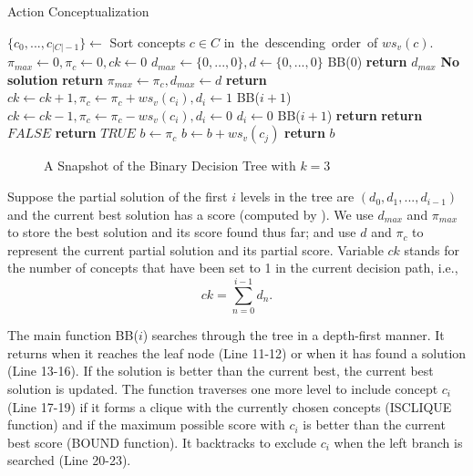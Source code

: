 \begin{algorithm}[th]
\caption{Action Conceptualization}
\label{al:backtrack}
\begin{algorithmic}[1]
\State $\{c_0,...,c_{|C|-1}\}\leftarrow$ Sort concepts $c\in C$ in\ the\ descending\ order\ of $ws_v(c)$.
\State $\pi_{max} \leftarrow 0,\pi_{c} \leftarrow 0,ck \leftarrow 0$
\State $d_{max}\leftarrow\{0,...,0\},d\leftarrow\{0,...,0\}$
\State BB($0$)
\State \textbf{return} $d_{max}$
\Else
\State \textbf{No solution}
\EndIf
\EndFunction
\Statex
{}
\State \textbf{return}
\EndIf
{}
\State $\pi_{max} \leftarrow \pi_{c}, d_{max} \leftarrow d$
\EndIf
\State \textbf{return}
\EndIf
{}
\State $ck \leftarrow ck+1, \pi_{c} \leftarrow \pi_{c}+ws_v(c_i), d_i \leftarrow 1$
\State BB($i+1$)
\State $ck \leftarrow ck-1, \pi_{c} \leftarrow \pi_{c}-ws_v(c_i), d_i \leftarrow 0$
\EndIf
{}
\State $d_i \leftarrow 0$
\State BB($i+1$)
\EndIf
\State \textbf{return}
\EndFunction
\Statex
{}
\State \textbf{return} $FALSE$
\EndIf
\EndIf
\EndFor
\State \textbf{return} $TRUE$
\EndFunction
\Statex
{}
\State $b \leftarrow \pi_{c}$
\State $b \leftarrow b+ws_v(c_{j})$
\EndFor
\State \textbf{return} $b$
\EndFunction
\end{algorithmic}
\end{algorithm}


\begin{figure}[th]
\centering
{}
\caption{A Snapshot of the Binary Decision Tree with $k=3$}
\label{fig:search_tree}
\end{figure}

Suppose the partial solution of the first $i$ levels in the tree
are $(d_0, d_1, ..., d_{i-1})$ and
the current best solution has a score (computed by ).
We use $d_{max}$ and $\pi_{max}$ to store the
best solution and its score found thus far; and use $d$ and $\pi_{c}$ to
represent the current partial solution and its partial score.
Variable $ck$ stands for the number of concepts that have been set to
1 in the current decision path, i.e.,
\[ck=\sum_{n=0}^{i-1}d_n.\]

The main function BB($i$) searches through the tree in a depth-first manner.
It returns when it reaches the leaf node (Line 11-12) or when it has found a
solution (Line 13-16). If the solution is better than the current best,
the current best solution is updated. The function traverses one
more level to include concept $c_i$ (Line 17-19) if it forms
a clique with the currently chosen concepts (ISCLIQUE function)
and if the maximum possible score with $c_i$ is better than
the current best score (BOUND function). It backtracks to exclude $c_i$
when the left branch is searched (Line 20-23).

